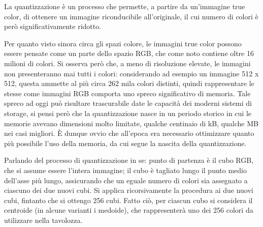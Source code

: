 \documentclass{subfiles}
\begin{document}
La quantizzazione è un processo che permette, a partire da un'immagine true color, di ottenere un immagine riconducibile all'originale,
il cui numero di colori è però significativamente ridotto.

Per quanto visto sinora circa gli spazi colore, le immagini true color possono essere pensate come un parte dello spazio RGB, che come noto contiene oltre 16 milioni di colori.
Si osserva però che, a meno di risoluzione elevate, le immagini non presenteranno mai tutti i colori: considerando ad esempio un immagine 512 x 512,
questa ammette al più circa 262 mila colori distinti,
quindi rappresentare le stesse come immagini RGB comporta uno spreco significativo di memoria.
Tale spreco ad oggi può risultare trascurabile date le capacità dei moderni sistemi di storage,
si pensi però che la quantizzazione nasce in un periodo storico in cui le memorie avevano dimensioni molto limitate, qualche centinaio di kB, qualche MB nei casi migliori.
\`E dunque ovvio che all'epoca era necessario ottimizzare quanto più possibile l'uso della memoria, da cui segue la nascita della quantizzazione.

Parlando del processo di quantizzazione in se\footnotemark[5]: punto di partenza è il cubo RGB, che si assume essere l'intera immagine;
il cubo è tagliato lungo il punto medio dell'asse più lungo, assicurando che un eguale numero di colori sia assegnato a ciascuno dei due nuovi cubi.
Si applica ricorsivamente la procedura ai due nuovi cubi, fintanto che si ottengo 256 cubi. Fatto ciò, per ciascun cubo si considera il centroide (in alcune varianti i medoide),
che rappresenterà uno dei 256 colori da utilizzare nella tavolozza.

\end{document}
